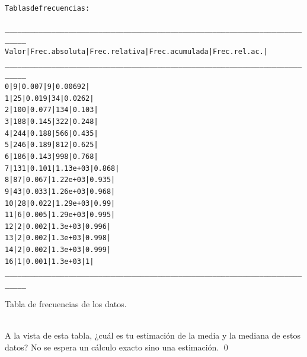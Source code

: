 \documentclass[10pt,a4paper]{article}\usepackage[]{graphicx}\usepackage[]{color}
\makeatletter
\newenvironment{kframe}{%
 \def\at@end@of@kframe{}%
 \ifinner\ifhmode%
  \def\at@end@of@kframe{\end{minipage}}%
  \begin{minipage}{\columnwidth}%
 \fi\fi%
 \def\FrameCommand##1{\hskip\@totalleftmargin \hskip-\fboxsep
 \colorbox{shadecolor}{##1}\hskip-\fboxsep
     \hskip-\linewidth \hskip-\@totalleftmargin \hskip\columnwidth}%
 \MakeFramed {\advance\hsize-\width
   \@totalleftmargin\z@ \linewidth\hsize
   \@setminipage}}%
 {\par\unskip\endMakeFramed%
 \at@end@of@kframe}
\newenvironment{knitrout}{}{} %
\makeatother
\begin{document}
\begin{table}[h!]
\begin{knitrout}
\color{fgcolor}\begin{kframe}
\begin{alltt}
Tablas de frecuencias:

___________________________________________________________________________
Valor | Frec. absoluta | Frec. relativa | Frec. acumulada | Frec. rel. ac. |
___________________________________________________________________________
    0 |              9 |          0.007 |               9 |        0.00692 |
    1 |             25 |          0.019 |              34 |         0.0262 |
    2 |            100 |          0.077 |             134 |          0.103 |
    3 |            188 |          0.145 |             322 |          0.248 |
    4 |            244 |          0.188 |             566 |          0.435 |
    5 |            246 |          0.189 |             812 |          0.625 |
    6 |            186 |          0.143 |             998 |          0.768 |
    7 |            131 |          0.101 |        1.13e+03 |          0.868 |
    8 |             87 |          0.067 |        1.22e+03 |          0.935 |
    9 |             43 |          0.033 |        1.26e+03 |          0.968 |
   10 |             28 |          0.022 |        1.29e+03 |           0.99 |
   11 |              6 |          0.005 |        1.29e+03 |          0.995 |
   12 |              2 |          0.002 |         1.3e+03 |          0.996 |
   13 |              2 |          0.002 |         1.3e+03 |          0.998 |
   14 |              2 |          0.002 |         1.3e+03 |          0.999 |
   16 |              1 |          0.001 |         1.3e+03 |              1 |
  ___________________________________________________________________________
\end{alltt}
\end{kframe}
\end{knitrout}
\caption{Tabla de frecuencias de los datos.}
\label{tabla:frecuenciasDatos}
\end{table}

\begin{ejercicio}
\label{tut02:ejercicio25}
\quad\\
A la vista de esta tabla, ¿cuál es tu estimación de la media y la mediana de estos datos? No se espera un cálculo exacto sino una estimación.
\qed
\end{ejercicio}
\end{document}
